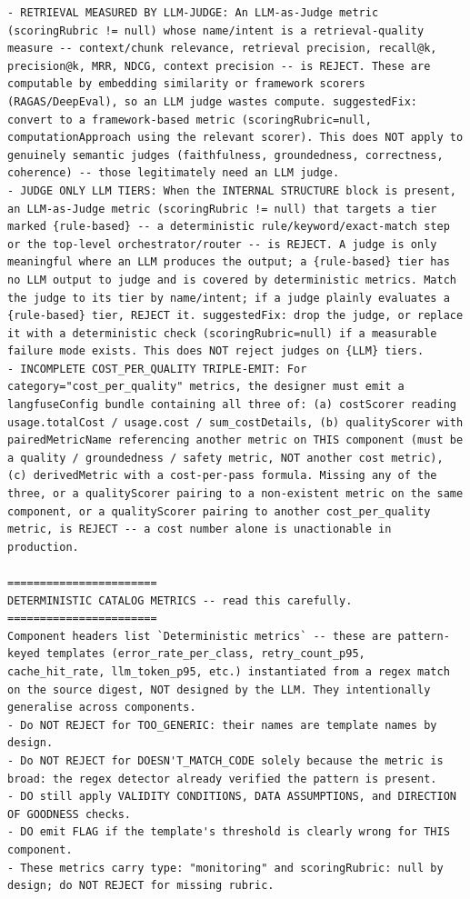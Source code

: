 \documentclass[11pt]{article}
\begin{document}
\begin{lstlisting}[style=prompt]
- RETRIEVAL MEASURED BY LLM-JUDGE: An LLM-as-Judge metric (scoringRubric != null) whose name/intent is a retrieval-quality measure -- context/chunk relevance, retrieval precision, recall@k, precision@k, MRR, NDCG, context precision -- is REJECT. These are computable by embedding similarity or framework scorers (RAGAS/DeepEval), so an LLM judge wastes compute. suggestedFix: convert to a framework-based metric (scoringRubric=null, computationApproach using the relevant scorer). This does NOT apply to genuinely semantic judges (faithfulness, groundedness, correctness, coherence) -- those legitimately need an LLM judge.
- JUDGE ONLY LLM TIERS: When the INTERNAL STRUCTURE block is present, an LLM-as-Judge metric (scoringRubric != null) that targets a tier marked {rule-based} -- a deterministic rule/keyword/exact-match step or the top-level orchestrator/router -- is REJECT. A judge is only meaningful where an LLM produces the output; a {rule-based} tier has no LLM output to judge and is covered by deterministic metrics. Match the judge to its tier by name/intent; if a judge plainly evaluates a {rule-based} tier, REJECT it. suggestedFix: drop the judge, or replace it with a deterministic check (scoringRubric=null) if a measurable failure mode exists. This does NOT reject judges on {LLM} tiers.
- INCOMPLETE COST_PER_QUALITY TRIPLE-EMIT: For category="cost_per_quality" metrics, the designer must emit a langfuseConfig bundle containing all three of: (a) costScorer reading usage.totalCost / usage.cost / sum_costDetails, (b) qualityScorer with pairedMetricName referencing another metric on THIS component (must be a quality / groundedness / safety metric, NOT another cost metric), (c) derivedMetric with a cost-per-pass formula. Missing any of the three, or a qualityScorer pairing to a non-existent metric on the same component, or a qualityScorer pairing to another cost_per_quality metric, is REJECT -- a cost number alone is unactionable in production.

=======================
DETERMINISTIC CATALOG METRICS -- read this carefully.
=======================
Component headers list `Deterministic metrics` -- these are pattern-keyed templates (error_rate_per_class, retry_count_p95, cache_hit_rate, llm_token_p95, etc.) instantiated from a regex match on the source digest, NOT designed by the LLM. They intentionally generalise across components.
- Do NOT REJECT for TOO_GENERIC: their names are template names by design.
- Do NOT REJECT for DOESN'T_MATCH_CODE solely because the metric is broad: the regex detector already verified the pattern is present.
- DO still apply VALIDITY CONDITIONS, DATA ASSUMPTIONS, and DIRECTION OF GOODNESS checks.
- DO emit FLAG if the template's threshold is clearly wrong for THIS component.
- These metrics carry type: "monitoring" and scoringRubric: null by design; do NOT REJECT for missing rubric.


\end{lstlisting}
\end{document}
